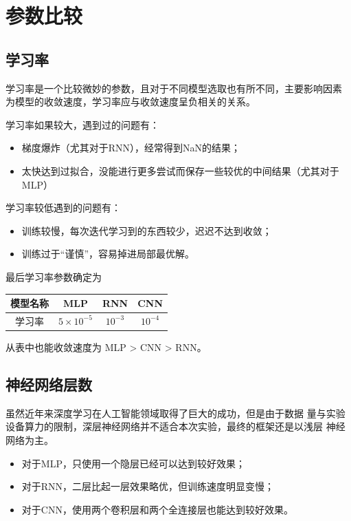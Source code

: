 \documentclass[a4paper]{article}
\begin{document}
    \newpage

    \section{参数比较}

    \subsection{学习率}
    学习率是一个比较微妙的参数，且对于不同模型选取也有所不同，主要影响因素
    为模型的收敛速度，学习率应与收敛速度呈负相关的关系。

    学习率如果较大，遇到过的问题有：
    \begin{itemize}
        \item 梯度爆炸（尤其对于RNN），经常得到NaN的结果；
        \item 太快达到过拟合，没能进行更多尝试而保存一些较优的中间结果（尤其对于MLP）
    \end{itemize}

    学习率较低遇到的问题有：
    \begin{itemize}
        \item 训练较慢，每次迭代学习到的东西较少，迟迟不达到收敛；
        \item 训练过于“谨慎”，容易掉进局部最优解。
    \end{itemize}

    最后学习率参数确定为
    \begin{table}[H]
        \centering

        \begin{tabular}{cccc}
            \toprule
            模型名称 & MLP & RNN & CNN\\
            \midrule
            学习率& $5\times 10^{-5}$ & $10^{-3}$ & $10^{-4}$\\
            \bottomrule
        \end{tabular}
    \end{table}

    从表中也能收敛速度为 MLP > CNN > RNN。

    \subsection{神经网络层数}

    虽然近年来深度学习在人工智能领域取得了巨大的成功，但是由于数据
    量与实验设备算力的限制，深层神经网络并不适合本次实验，最终的框架还是以浅层
    神经网络为主。
    \begin{itemize} 
        \item 对于MLP，只使用一个隐层已经可以达到较好效果；
        \item 对于RNN，二层比起一层效果略优，但训练速度明显变慢；
        \item 对于CNN，使用两个卷积层和两个全连接层也能达到较好效果。
    \end{itemize}
\end{document}
